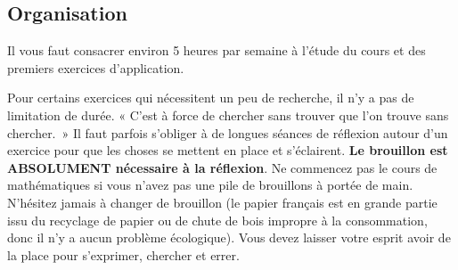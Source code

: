 \documentclass[12pt,fleqn]{report} %
\begin{document}
\subsection*{Organisation}

Il vous faut consacrer environ 5 heures par semaine à l’étude du cours et des premiers exercices d’application.

Pour certains exercices qui nécessitent un peu de recherche, il n'y a pas de limitation de durée. « C’est à force de chercher sans trouver que l’on trouve sans chercher.~» Il faut parfois s’obliger à de longues séances de réflexion autour d’un exercice pour que les choses se mettent en place et s’éclairent. \textbf{Le brouillon est ABSOLUMENT nécessaire à la réflexion}. Ne commencez pas le cours de mathématiques si vous n'avez pas une pile de brouillons à portée de main. N'hésitez jamais à changer de brouillon (le papier français est en grande partie issu du recyclage de papier ou de chute de bois impropre à la consommation, donc il n'y a aucun problème écologique). Vous devez laisser votre esprit avoir de la place pour s'exprimer, chercher et errer. \\
\end{document}
